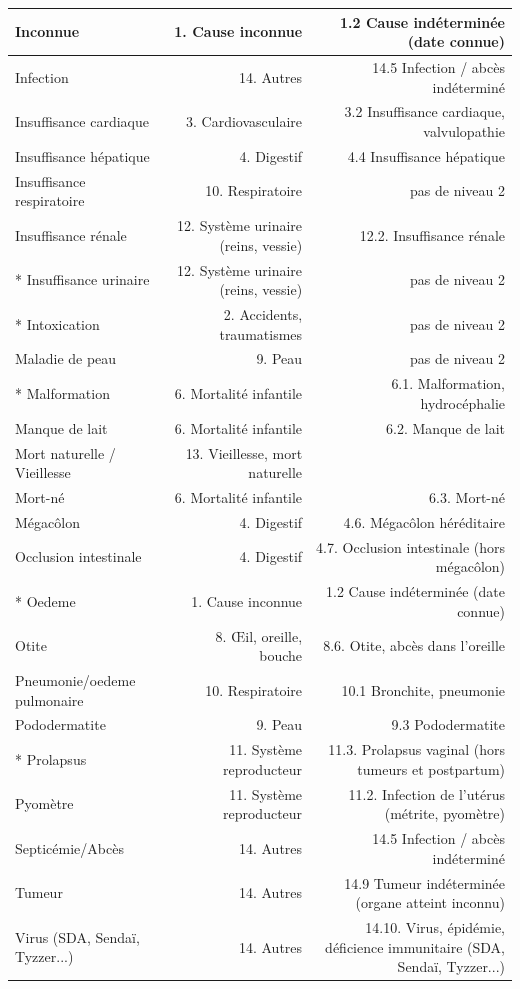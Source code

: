 \documentclass[a4paper,10pt]{article}
\begin{document}
\begin{tabularx}{\textwidth}{|l|R|R|}
Inconnue & 1. Cause inconnue & 1.2 Cause indéterminée (date connue)\\\hline
Infection & 14. Autres & 14.5 Infection / abcès indéterminé\\\hline
Insuffisance cardiaque & 3. Cardiovasculaire & 3.2 Insuffisance cardiaque, valvulopathie\\\hline
Insuffisance hépatique & 4. Digestif & 4.4 Insuffisance hépatique\\\hline
Insuffisance respiratoire & 10. Respiratoire & pas de niveau 2\\\hline
Insuffisance rénale & 12. Système urinaire (reins, vessie) & 12.2. Insuffisance rénale\\\hline
* Insuffisance urinaire & 12. Système urinaire (reins, vessie) & pas de niveau 2\\\hline
* Intoxication & 2. Accidents, traumatismes & pas de niveau 2\\\hline
Maladie de peau & 9. Peau & pas de niveau 2\\\hline
* Malformation & 6. Mortalité infantile & 6.1.   	Malformation, hydrocéphalie\\\hline
Manque de lait & 6. Mortalité infantile & 6.2. Manque de lait\\\hline
Mort naturelle / Vieillesse & 13. Vieillesse, mort naturelle &\\\hline
Mort-né & 6. Mortalité infantile & 6.3. Mort-né\\\hline
Mégacôlon & 4. Digestif & 4.6. Mégacôlon héréditaire\\\hline
Occlusion intestinale & 4. Digestif & 4.7. Occlusion intestinale (hors mégacôlon)\\\hline
* Oedeme & 1. Cause inconnue & 1.2 Cause indéterminée (date connue)\\\hline
Otite & 8. Œil, oreille, bouche & 8.6. Otite, abcès dans l'oreille\\\hline
Pneumonie/oedeme pulmonaire & 10. Respiratoire & 10.1 Bronchite, pneumonie\\\hline
Pododermatite & 9. Peau & 9.3 Pododermatite\\\hline
* Prolapsus & 11. Système reproducteur & 11.3. Prolapsus vaginal (hors tumeurs et postpartum)\\\hline
Pyomètre & 11. Système reproducteur & 11.2.  Infection de l'utérus (métrite, pyomètre)\\\hline
Septicémie/Abcès & 14. Autres & 14.5 Infection / abcès indéterminé\\\hline
Tumeur & 14. Autres & 14.9 Tumeur indéterminée (organe atteint inconnu)\\\hline
Virus (SDA, Sendaï, Tyzzer...) & 14. Autres & 14.10. Virus, épidémie, déficience immunitaire (SDA, Sendaï, Tyzzer...)\\\hline
\end{tabularx}
\normalsize
\end{document}
